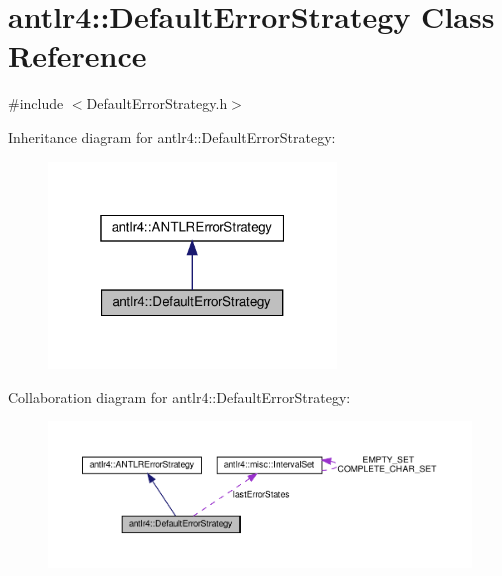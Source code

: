\hypertarget{classantlr4_1_1DefaultErrorStrategy}{}\section{antlr4\+:\+:Default\+Error\+Strategy Class Reference}
\label{classantlr4_1_1DefaultErrorStrategy}


{\ttfamily \#include $<$Default\+Error\+Strategy.\+h$>$}



Inheritance diagram for antlr4\+:\+:Default\+Error\+Strategy\+:
\nopagebreak
\begin{figure}[H]
\begin{center}
\leavevmode
\includegraphics[width=217pt]{classantlr4_1_1DefaultErrorStrategy__inherit__graph}
\end{center}
\end{figure}


Collaboration diagram for antlr4\+:\+:Default\+Error\+Strategy\+:
\nopagebreak
\begin{figure}[H]
\begin{center}
\leavevmode
\includegraphics[width=350pt]{classantlr4_1_1DefaultErrorStrategy__coll__graph}
\end{center}
\end{figure}
